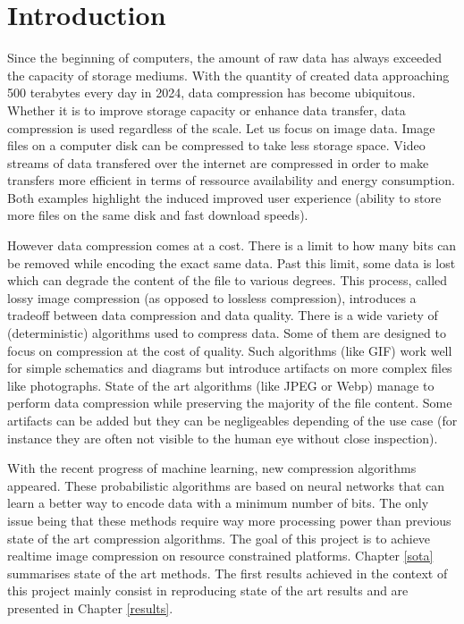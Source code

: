 \chapter*{Introduction}
Since the beginning of computers, the amount of raw data has always exceeded the capacity of storage mediums. With the quantity of created data approaching 500 terabytes every day in 2024, data compression has become ubiquitous. Whether it is to improve storage capacity or enhance data transfer, data compression is used regardless of the scale. Let us focus on image data. Image files on a computer disk can be compressed to take less storage space. Video streams of data transfered over the internet are compressed in order to make transfers more efficient in terms of ressource availability and energy consumption. Both examples highlight the induced improved user experience (ability to store more files on the same disk and fast download speeds).

However data compression comes at a cost. There is a limit to how many bits can be removed while encoding the exact same data. Past this limit, some data is lost which can degrade the content of the file to various degrees. This process, called lossy image compression (as opposed to lossless compression), introduces a tradeoff between data compression and data quality. There is a wide variety of (deterministic) algorithms used to compress data. Some of them are designed to focus on compression at the cost of quality. Such algorithms (like GIF) work well for simple schematics and diagrams but introduce artifacts on more complex files like photographs. State of the art algorithms (like JPEG or Webp) manage to perform data compression while preserving the majority of the file content. Some artifacts can be added but they can be negligeables depending of the use case (for instance they are often not visible to the human eye without close inspection).

With the recent progress of machine learning, new compression algorithms appeared. These probabilistic algorithms are based on neural networks that can learn a better way to encode data with a minimum number of bits. The only issue being that these methods require way more processing power than previous state of the art compression algorithms. The goal of this project is to achieve realtime image compression on resource constrained platforms. Chapter \ref{sota} summarises state of the art methods. The first results achieved in the context of this project mainly consist in reproducing state of the art results and are presented in Chapter \ref{results}.
